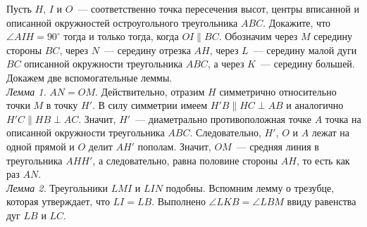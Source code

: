 
\problem
Пусть $H$, $I$ и $O$~--- соответственно точка пересечения высот, центры
вписанной и описанной окружностей остроугольного треугольника $ABC$.
Докажите, что $\angle AIH = 90^\circ$ тогда и только тогда, когда
$OI \parallel BC$.
\solution
Обозначим через $M$ середину стороны $BC$, через $N$~--- середину отрезка $AH$,
через $L$~--- середину малой дуги $BC$ описанной окружности треугольника $ABC$,
а через $K$~--- середину большей.
Докажем две вспомогательные леммы.
\\
\emph{Лемма 1.} $AN = OM$.
Действительно, отразим $H$ симметрично относительно точки $M$ в точку $H'$.
В силу симметрии имеем $H'B \parallel HC \perp AB$ и аналогично
$H'C \parallel HB \perp AC$.
Значит, $H'$~--- диаметрально противоположная точке $A$ точка на описанной
окружности треугольника $ABC$.
Следовательно, $H'$, $O$ и $A$ лежат на одной прямой и $O$ делит $AH'$ пополам.
Значит, $OM$~--- средняя линия в треугольника $AHH'$, а следовательно, равна
половине стороны $AH$, то есть как раз $AN$.
\\
\emph{Лемма 2.} Треугольники $LMI$ и $LIN$ подобны.
Вспомним лемму о трезубце, которая утверждает, что $LI = LB$.
Выполнено $\angle LKB = \angle LBM$ ввиду равенства дуг $LB$ и $LC$.
